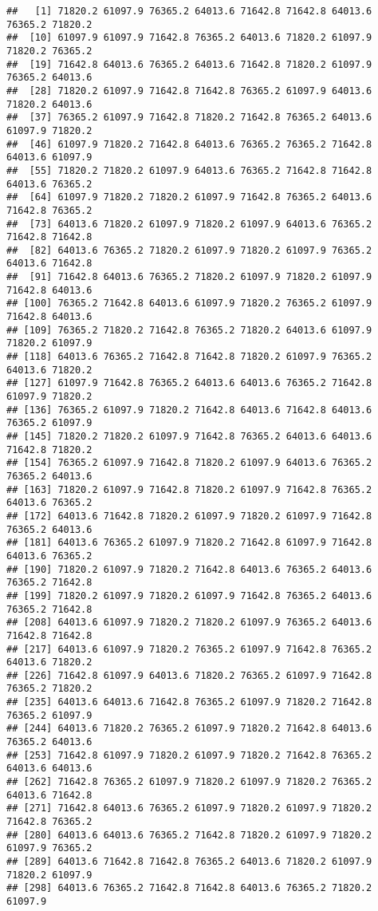 \documentclass[
]{article}
\begin{document}
\begin{verbatim}
##   [1] 71820.2 61097.9 76365.2 64013.6 71642.8 71642.8 64013.6 76365.2 71820.2
##  [10] 61097.9 61097.9 71642.8 76365.2 64013.6 71820.2 61097.9 71820.2 76365.2
##  [19] 71642.8 64013.6 76365.2 64013.6 71642.8 71820.2 61097.9 76365.2 64013.6
##  [28] 71820.2 61097.9 71642.8 71642.8 76365.2 61097.9 64013.6 71820.2 64013.6
##  [37] 76365.2 61097.9 71642.8 71820.2 71642.8 76365.2 64013.6 61097.9 71820.2
##  [46] 61097.9 71820.2 71642.8 64013.6 76365.2 76365.2 71642.8 64013.6 61097.9
##  [55] 71820.2 71820.2 61097.9 64013.6 76365.2 71642.8 71642.8 64013.6 76365.2
##  [64] 61097.9 71820.2 71820.2 61097.9 71642.8 76365.2 64013.6 71642.8 76365.2
##  [73] 64013.6 71820.2 61097.9 71820.2 61097.9 64013.6 76365.2 71642.8 71642.8
##  [82] 64013.6 76365.2 71820.2 61097.9 71820.2 61097.9 76365.2 64013.6 71642.8
##  [91] 71642.8 64013.6 76365.2 71820.2 61097.9 71820.2 61097.9 71642.8 64013.6
## [100] 76365.2 71642.8 64013.6 61097.9 71820.2 76365.2 61097.9 71642.8 64013.6
## [109] 76365.2 71820.2 71642.8 76365.2 71820.2 64013.6 61097.9 71820.2 61097.9
## [118] 64013.6 76365.2 71642.8 71642.8 71820.2 61097.9 76365.2 64013.6 71820.2
## [127] 61097.9 71642.8 76365.2 64013.6 64013.6 76365.2 71642.8 61097.9 71820.2
## [136] 76365.2 61097.9 71820.2 71642.8 64013.6 71642.8 64013.6 76365.2 61097.9
## [145] 71820.2 71820.2 61097.9 71642.8 76365.2 64013.6 64013.6 71642.8 71820.2
## [154] 76365.2 61097.9 71642.8 71820.2 61097.9 64013.6 76365.2 76365.2 64013.6
## [163] 71820.2 61097.9 71642.8 71820.2 61097.9 71642.8 76365.2 64013.6 76365.2
## [172] 64013.6 71642.8 71820.2 61097.9 71820.2 61097.9 71642.8 76365.2 64013.6
## [181] 64013.6 76365.2 61097.9 71820.2 71642.8 61097.9 71642.8 64013.6 76365.2
## [190] 71820.2 61097.9 71820.2 71642.8 64013.6 76365.2 64013.6 76365.2 71642.8
## [199] 71820.2 61097.9 71820.2 61097.9 71642.8 76365.2 64013.6 76365.2 71642.8
## [208] 64013.6 61097.9 71820.2 71820.2 61097.9 76365.2 64013.6 71642.8 71642.8
## [217] 64013.6 61097.9 71820.2 76365.2 61097.9 71642.8 76365.2 64013.6 71820.2
## [226] 71642.8 61097.9 64013.6 71820.2 76365.2 61097.9 71642.8 76365.2 71820.2
## [235] 64013.6 64013.6 71642.8 76365.2 61097.9 71820.2 71642.8 76365.2 61097.9
## [244] 64013.6 71820.2 76365.2 61097.9 71820.2 71642.8 64013.6 76365.2 64013.6
## [253] 71642.8 61097.9 71820.2 61097.9 71820.2 71642.8 76365.2 64013.6 64013.6
## [262] 71642.8 76365.2 61097.9 71820.2 61097.9 71820.2 76365.2 64013.6 71642.8
## [271] 71642.8 64013.6 76365.2 61097.9 71820.2 61097.9 71820.2 71642.8 76365.2
## [280] 64013.6 64013.6 76365.2 71642.8 71820.2 61097.9 71820.2 61097.9 76365.2
## [289] 64013.6 71642.8 71642.8 76365.2 64013.6 71820.2 61097.9 71820.2 61097.9
## [298] 64013.6 76365.2 71642.8 71642.8 64013.6 76365.2 71820.2 61097.9
\end{verbatim}
\end{document}
